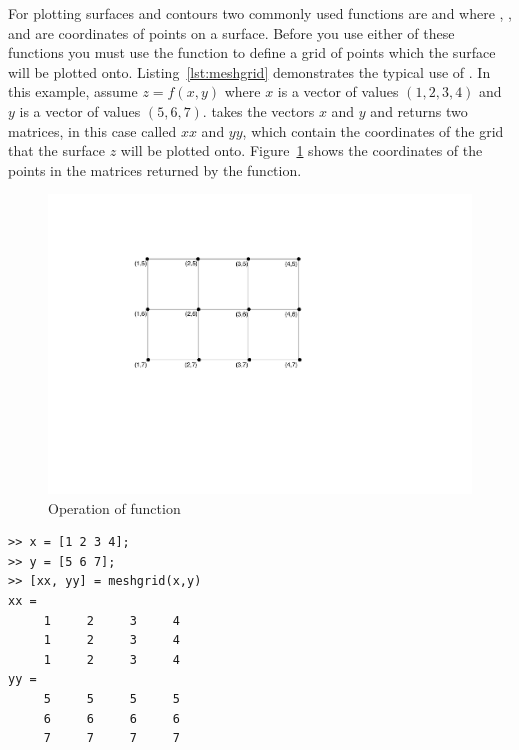 For plotting surfaces and contours two commonly used functions are  and  where , , and  are coordinates of points on a surface. Before you use either of these functions you must use the  function to define a grid of points which the surface will be plotted onto. Listing~\ref{lst:meshgrid} demonstrates the typical use of . In this example, assume $z=f(x,y)$ where $x$ is a vector of values $(1,2,3,4)$ and $y$ is a vector of values $(5,6,7)$.  takes the vectors $x$ and $y$ and returns two matrices, in this case called $xx$ and $yy$, which contain the coordinates of the grid that the surface $z$ will be plotted onto. Figure~\ref{fig:meshgrid} shows the coordinates of the points in the matrices returned by the  function.
\begin{figure}
	\myfloatalign
	\includegraphics[width=0.70\linewidth]{Graphics/Unit02/meshgrid}
	\caption{Operation of  function}
	\label{fig:meshgrid}
\end{figure}

\begin{lstlisting}[caption={Using \mcode{meshgrid}},label=lst:meshgrid]
>> x = [1 2 3 4];
>> y = [5 6 7];
>> [xx, yy] = meshgrid(x,y)
xx =
     1     2     3     4
     1     2     3     4
     1     2     3     4
yy =
     5     5     5     5
     6     6     6     6
     7     7     7     7
\end{lstlisting}

